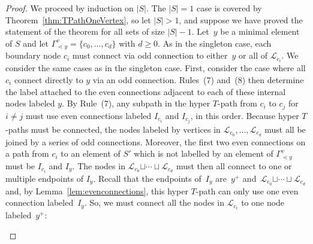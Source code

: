 \documentclass[pdftex]{sigma}
\numberwithin{equation}{section}
\newcommand{\new}[1]{{#1}}
\begin{document}
\begin{proof}
We proceed by induction on $\vert S \vert$. The $\vert S \vert = 1$ case is covered by Theorem~\ref{thm:TPathOneVertex}, so let $\vert S \vert > 1$, and suppose we have proved the statement of the theorem for all sets of size $\vert S \vert-1$. Let~$y$ be a minimal element of $S$ and let $\Gamma_{\lessdot y}^v = \{c_0,\ldots,c_d\}$ with $d \geq 0$. As in the singleton case, each boundary node $c_i$ must connect via odd connection to either~$y$ or all of $\mathcal{L}_{c_i}$. We consider the same cases as in the singleton case.
First, consider the case where all $c_i$ connect directly to $y$ via an odd connection. Rules~(7) and~(8) then determine the label attached to the even connections adjacent to each of these internal nodes labeled $y$. By Rule~(7), any subpath in the hyper $T$-path from $c_i$ to $c_j$ for $i \neq j$ must use even connections labeled $I_{c_i}$ and $I_{c_j}$, in this order. Because hyper $T$-paths must be connected, the nodes labeled by vertices in $\mathcal{L}_{c_0}, \dots, \mathcal{L}_{c_d}$ must all be joined by a series of odd connections. Moreover, the first two even connections on a path from $c_i$ to an element of $S'$ which is not labelled by an element of $\Gamma_{\lessdot y}^v$ must be $I_{c_i}$ and $I_y$. The nodes in $\mathcal{L}_{c_0} \new{\sqcup \cdots \sqcup} \mathcal{L}_{c_d}$ must then all connect to one or multiple endpoints of $I_y$. Recall that the endpoints of~$I_y$ are~$y^+$ and~$\mathcal{L}_{c_0} \new{\sqcup \cdots \sqcup} \mathcal{L}_{c_d}$ and, by Lemma~\ref{lem:evenconnections}, this hyper $T$-path can only use one even connection labeled~$I_y$. So, we must connect all the nodes in $\mathcal{L}_{c_i}$ to one node labeled~$y^+$:
\begin{center}
\end{center}
\end{proof}
\end{document}
